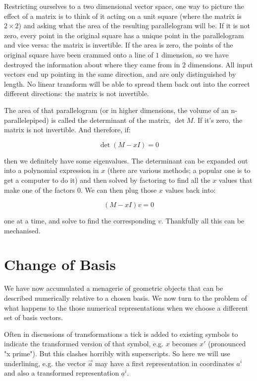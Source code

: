 Restricting ourselves to a two dimensional vector space, one way to picture the effect of a matrix is to think of it acting on a unit square (where the matrix is $2 \times 2$) and asking what the area of the resulting parallelogram will be. If it is not zero, every point in the original square has a unique point in the parallelogram and vice versa: the matrix is invertible. If the area is zero, the points of the original square have been crammed onto a line of $1$ dimension, so we have destroyed the information about where they came from in $2$ dimensions. All input vectors end up pointing in the same direction, and are only distinguished by length. No linear transform will be able to spread them back out into the correct different directions: the matrix is not invertible.

The area of that parallelogram (or in higher dimensions, the volume of an n-parallelepiped) is called the determinant of the matrix, $\det M$. If it's zero, the matrix is not invertible. And therefore, if:

$$\det{(M - xI)} = 0$$

then we definitely have some eigenvalues. The determinant can be expanded out into a polynomial expression in $x$ (there are various methods; a popular one is to get a computer to do it) and then solved by factoring to find all the $x$ values that make one of the factors $0$. We can then plug those $x$ values back into:

$$(M - xI)v = 0$$

one at a time, and solve to find the corresponding $v$. Thankfully all this can be mechanised.

\section{Change of Basis}\label{sec:vectors-change-basis}

We have now accumulated a menagerie of geometric objects that can be described numerically relative to a chosen basis. We now turn to the problem of what happens to the those numerical representations when we choose a different set of basis vectors.

Often in discussions of transformations a tick is added to existing symbols to indicate the transformed version of that symbol, e.g. $x$ becomes $x'$ (pronounced "x prime"). But this clashes horribly with superscripts. So here we will use underlining, e.g. the vector $\vec{a}$ may have a first representation in coordinates $a^i$ and also a transformed representation $\underline{a}^i$.

